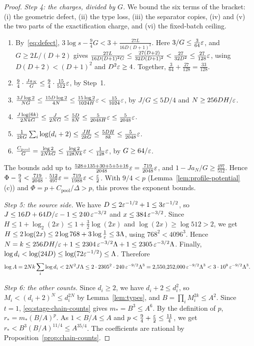 \begin{proof}
\emph{Step 4: the charges, divided by \(G\).} We bound the six terms of
the bracket: (i) the geometric defect, (ii) the type loss, (iii) the
separator copies, (iv) and (v) the two parts of the exactification
charge, and (vi) the fixed-batch ceiling.
\begin{enumerate}
\item[(i)] By~\eqref{eq:defect},
\(3\log s-\frac94G<3+\frac{27L}{16D(D+1)^2}\). Here
\(3/G\le\frac3{64}\varepsilon\), and \(G\ge2L/(D+2)\) gives
\(\frac{27L}{16D(D+1)^2G}\le\frac{27(D+2)}{32D(D+1)^2}<\frac{27}{32D^2}
\le\frac{27}{128}\varepsilon\), using \(D(D+2)<(D+1)^2\) and
\(D^2\varepsilon\ge4\). Together, \(\frac3{64}+\frac{27}{128}=\frac{33}{128}\).
\item[(ii)] \(\frac94\cdot\frac{Ja_N}G\le\frac94\cdot\frac{15}{512}\varepsilon\),
by Step~1.
\item[(iii)] \(\frac{3J\log2}{NG}\le\frac{15D\log2}{4N}
\le\frac{15\log2}{1024H}\varepsilon<\frac{15}{1024}\varepsilon\), by \(J/G\le5D/4\) and
\(N\ge256DH/\varepsilon\).
\item[(iv)] \(\frac{J\log(6k)}{2NkG}\le\frac J{2NG}\le\frac{5D}{8N}
\le\frac5{2048H}\varepsilon\le\frac5{2048}\varepsilon\).
\item[(v)] \(\frac1{2kG}\sum_i\log(d_i+2)\le\frac{JH}{2kG}
\le\frac{5DH}{8k}\le\frac5{2048}\varepsilon\).
\item[(vi)] \(\frac{C_{\mathrm{pool}}}G=\frac{\log2}{2NkG}
\le\frac{\log2}{128Nk}\varepsilon<\frac1{128}\varepsilon\), by \(G\ge64/\varepsilon\).
\end{enumerate}
The bounds add up to
\(\frac{528+135+30+5+5+16}{2048}\varepsilon=\frac{719}{2048}\varepsilon\), and
\(1-Ja_N/G\ge\frac{497}{512}\). Hence
\(\Phi-\frac94<\frac{719}{2048}\cdot\frac{512}{497}\varepsilon
=\frac{719}{1988}\varepsilon<\frac{\varepsilon}2\). With \(9/4<p\)
(Lemma~\ref{lem:profile-potential}(c)) and
\(\Phi=p+C_{\mathrm{pool}}/\Delta>p\), this proves the exponent bounds.

\emph{Step 5: the source side.} We have
\(D\le2\varepsilon^{-1/2}+1\le3\varepsilon^{-1/2}\), so
\(J\le16D+64D/\varepsilon-1\le240\,\varepsilon^{-3/2}\) and
\(x\le384\,\varepsilon^{-3/2}\). Since
\(H\le1+\log_2(2x)\le1+\frac32\log(2x)\) and \(\log(2x)\ge\log512>2\),
we get \(H\le2\log(2x)\le2\log768+3\log\frac1{\varepsilon}\le3\Lambda\), using
\(768^2<4096^3\). Hence
\(N=k\le256DH/\varepsilon+1\le2304\,\varepsilon^{-3/2}\Lambda+1
\le2305\,\varepsilon^{-3/2}\Lambda\). Finally,
\(\log d_i<\log(24D)\le\log(72\varepsilon^{-1/2})\le\Lambda\). Therefore
\[
 \log A=2Nk\sum_i\log d_i<2N^2J\Lambda
 \le2\cdot2305^2\cdot240\,\varepsilon^{-9/2}\Lambda^3
 =2{,}550{,}252{,}000\,\varepsilon^{-9/2}\Lambda^3
 <3\cdot10^9\,\varepsilon^{-9/2}\Lambda^3 .
\]

\emph{Step 6: the other counts.} Since \(d_i\ge2\), we have
\(d_i+2\le d_i^2\), so \(M_i<(d_i+2)^N\le d_i^{2N}\) by
Lemma~\ref{lem:types}, and \(B=\prod_iM_i^{2k}\le A^2\). Since \(t=1\),
\eqref{eq:stage-chain-counts} gives \(m_*=B^3\le A^6\). By the definition
of \(p\), \(r_*=m_*(B/A)^p\). As \(1<B/A\le A\) and
\(p<\frac94+\frac{\varepsilon}2\le\frac{11}4\), we get
\(r_*<B^3(B/A)^{11/4}\le A^{35/4}\). The coefficients are rational by
Proposition~\ref{prop:chain-counts}.
\end{proof}


